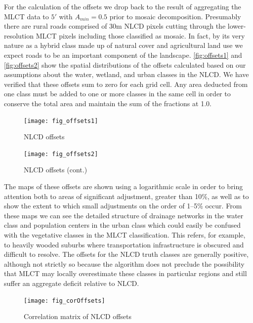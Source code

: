 For the calculation of the offsets we drop back to the result of
aggregating the MLCT data to $5'$ with $A_{min}=0.5$ prior to mosaic
decomposition.  Presumably there are rural roads comprised of 30m NLCD
pixels cutting through the lower-resolution MLCT pixels including
those classified as mosaic.  In fact, by its very nature as a hybrid
class made up of natural cover and agricultural land use we expect
roads to be an important component of the landscape.
\autoref{fig:offsets1} and \autoref{fig:offsets2} show the spatial
distributions of the offsets calculated based on our assumptions about
the water, wetland, and urban classes in the NLCD.  We have verified
that these offsets sum to zero for each grid cell.  Any area deducted
from one class must be added to one or more classes in the same cell
in order to conserve the total area and maintain the sum of the
fractions at 1.0.


\begin{figure}[hpt]
  \centering


\texttt{[image: fig\_offsets1]}
  \caption{NLCD offsets}
  \label{fig:offsets1} 
\end{figure} 


\begin{figure}[hpt]
  \centering


\texttt{[image: fig\_offsets2]}
  \caption{NLCD offsets (cont.)}
  \label{fig:offsets2} 
\end{figure} 


The maps of these offsets are shown using a logarithmic scale in
order to bring attention both to areas of significant adjustment,
greater than 10\%, as well as to show the extent to which small
adjustments on the order of 1--5\% occur.  From these maps we can see
the detailed structure of drainage networks in the water class and
population centers in the urban class which could easily be confused
with the vegetative classes in the MLCT classification.  This refers,
for example, to heavily wooded suburbs where transportation
infrastructure is obscured and difficult to resolve.  The offsets for
the NLCD truth classes are generally positive, although not strictly
so because the algorithm does not preclude the possibility that MLCT
may locally overestimate these classes in particular regions and still
suffer an aggregate deficit relative to NLCD.


\begin{figure}[hpt]
  \centering
    \texttt{[image: fig\_corOffsets]}
  \caption{Correlation matrix of NLCD offsets}
  \label{fig:corOffsets} 
\end{figure} 

